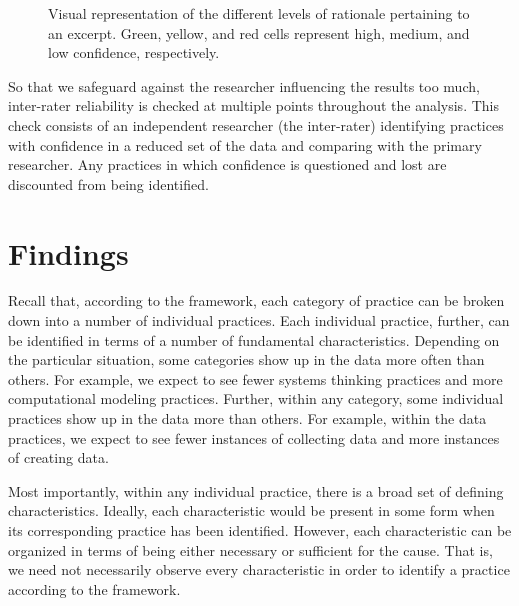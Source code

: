\documentclass{msuphddissertation}
\begin{document}
\begin{doublespace}
\begin{figure}[ht]\centering
\caption{Visual representation of the different levels of rationale pertaining to an excerpt.  Green, yellow, and red cells represent high, medium, and low confidence, respectively.}\label{CH3:VariableAnalysis}
\end{figure}

So that we safeguard against the researcher influencing the results too much, inter-rater reliability is checked at multiple points throughout the analysis.  This check consists of an independent researcher (the inter-rater) identifying practices with confidence in a reduced set of the data and comparing with the primary researcher.  Any practices in which confidence is questioned and lost are discounted from being identified.

\section{Findings}

Recall that, according to the framework, each category of practice can be broken down into a number of individual practices.  Each individual practice, further, can be identified in terms of a number of fundamental characteristics.  Depending on the particular situation, some categories show up in the data more often than others.  For example, we expect to see fewer systems thinking practices and more computational modeling practices.  Further, within any category, some individual practices show up in the data more than others.  For example, within the data practices, we expect to see fewer instances of collecting data and more instances of creating data.

Most importantly, within any individual practice, there is a broad set of defining characteristics.  Ideally, each characteristic would be present in some form when its corresponding practice has been identified.  However, each characteristic can be organized in terms of being either necessary or sufficient for the cause.  That is, we need not necessarily observe every characteristic in order to identify a practice according to the framework.


\end{doublespace}
\end{document}
